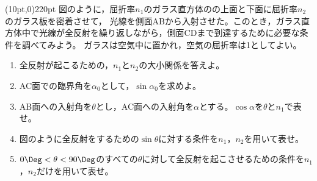 \hakosyokika
\item
    \begin{mawarikomi}(10pt,0){220pt}{}
    図のように，屈折率$n_1$のガラス直方体のの上面と下面に屈折率$n_2$のガラス板を密着させて，
    光線を側面ABから入射させた。このとき，ガラス直方体中で光線が全反射を繰り返しながら，側面CDまで到達するために必要な条件を調べてみよう。
    ガラスは空気中に置かれ，空気の屈折率は1としてよい。
        \begin{enumerate}
            \item 全反射が起こるための，$n_1$と$n_2$の大小関係を答えよ。
            \item AC面での臨界角を$\alpha _0$として，$\sin{\alpha _0}$を求めよ。
            \item AB面への入射角を$\theta $とし，AC面への入射角を$\alpha $とする。$\cos{\alpha}$を$\theta $と$n_1$で表せ。
            \item 図のように全反射をするための$\sin{\theta }$に対する条件を$n_1$，$n_2$を用いて表せ。
            \item $0\Deg < \theta < 90\Deg $のすべての$\theta $に対して全反射を起こさせるための条件を$n_1$，$n_2$だけを用いて表せ。
        \end{enumerate}
    \end{mawarikomi}